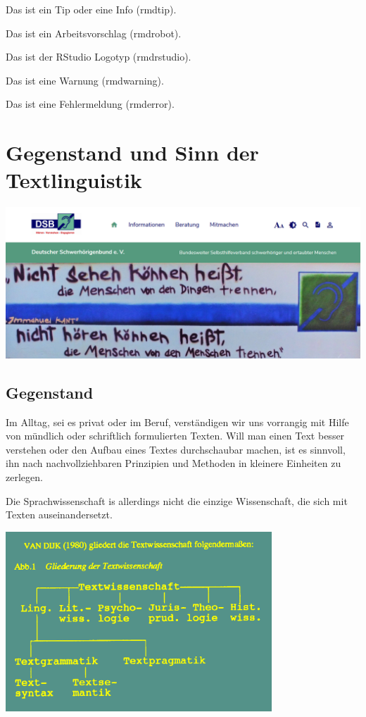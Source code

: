 \documentclass[
  letterpaper,
]{scrbook}
\begin{document}
Das ist ein Tip oder eine Info (rmdtip).

Das ist ein Arbeitsvorschlag (rmdrobot).

Das ist der RStudio Logotyp (rmdrstudio).

Das ist eine Warnung (rmdwarning).

Das ist eine Fehlermeldung (rmderror).

\hypertarget{sec-gegenstand}{%
\chapter{Gegenstand und Sinn der Textlinguistik}\label{sec-gegenstand}}

\includegraphics[width=1\textwidth,height=\textheight]{./pictures/DSB_SDH 2021-02-25 105118.png}

\hypertarget{gegenstand}{%
\section{Gegenstand}\label{gegenstand}}

Im Alltag, sei es privat oder im Beruf, verständigen wir uns vorrangig
mit Hilfe von mündlich oder schriftlich formulierten Texten. Will man
einen Text besser verstehen oder den Aufbau eines Textes durchschaubar
machen, ist es sinnvoll, ihn nach nachvollziehbaren Prinzipien und
Methoden in kleinere Einheiten zu zerlegen.

Die Sprachwissenschaft is allerdings nicht die einzige Wissenschaft, die
sich mit Texten auseinandersetzt.

\includegraphics[width=0.75\textwidth,height=\textheight]{./pictures/textwissenschaften.png}
\end{document}
